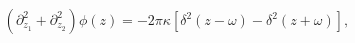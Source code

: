 \begin{equation}
\left(
\partial_{z_1}^2+\partial_{z_2}^2\right)\phi(z)
=-2\pi\kappa\left[
\delta^2(z-\omega)-\delta^2(z+\omega)\right],
\end{equation}

